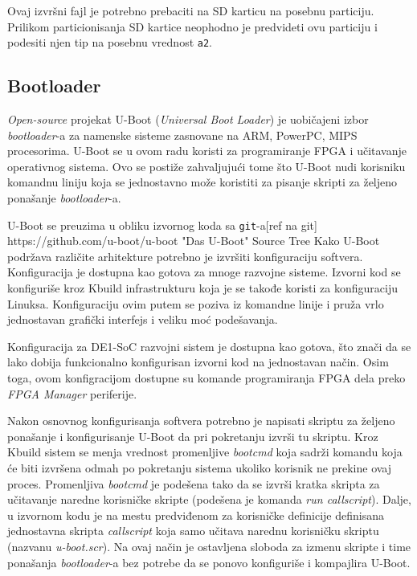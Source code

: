 Ovaj izvršni fajl je potrebno prebaciti na SD karticu na posebnu particiju. Prilikom particionisanja SD kartice neophodno je predvideti ovu particiju i podesiti njen tip na posebnu vrednost \texttt{a2}.

\subsection{Bootloader}
\textit{Open-source} projekat U-Boot (\textit{Universal Boot Loader}) je uobičajeni izbor \textit{bootloader}-a za namenske sisteme zasnovane na ARM, PowerPC, MIPS procesorima. U-Boot se u ovom radu koristi za programiranje FPGA i učitavanje operativnog sistema. Ovo se postiže zahvaljujući tome što U-Boot nudi korisniku komandnu liniju koja se jednostavno može koristiti za pisanje skripti za željeno ponašanje \textit{bootloader}-a.

U-Boot se preuzima u obliku izvornog koda sa \texttt{git}-a[ref na git]
https://github.com/u-boot/u-boot
"Das U-Boot" Source Tree
Kako U-Boot podržava različite arhitekture potrebno je izvršiti konfiguraciju softvera. Konfiguracija je dostupna kao gotova za mnoge razvojne sisteme. Izvorni kod se konfiguriše kroz Kbuild infrastrukturu koja je se takođe koristi za konfiguraciju Linuksa. Konfiguraciju ovim putem se poziva iz komandne linije i pruža vrlo jednostavan grafički interfejs i veliku moć podešavanja.

Konfiguracija za DE1-SoC razvojni sistem je dostupna kao gotova, što znači da se lako dobija funkcionalno konfigurisan izvorni kod na jednostavan način. Osim toga, ovom konfigracijom dostupne su komande programiranja FPGA dela preko \textit{FPGA Manager} periferije.

Nakon osnovnog konfigurisanja softvera potrebno je napisati skriptu za željeno ponašanje i konfigurisanje U-Boot da pri pokretanju izvrši tu skriptu. Kroz Kbuild sistem se menja vrednost promenljive \textit{bootcmd} koja sadrži komandu koja će biti izvršena odmah po pokretanju sistema ukoliko korisnik ne prekine ovaj proces. Promenljiva \textit{bootcmd} je podešena tako da se izvrši kratka skripta za učitavanje naredne korisničke skripte (podešena je komanda \textit{run callscript}). Dalje, u izvornom kodu je na mestu predviđenom za korisničke definicije definisana jednostavna skripta \textit{callscript} koja samo učitava narednu korisničku skriptu (nazvanu \textit{u-boot.scr}). Na ovaj način je ostavljena sloboda za izmenu skripte i time ponašanja \textit{bootloader}-a bez potrebe da se ponovo konfiguriše i kompajlira U-Boot.

